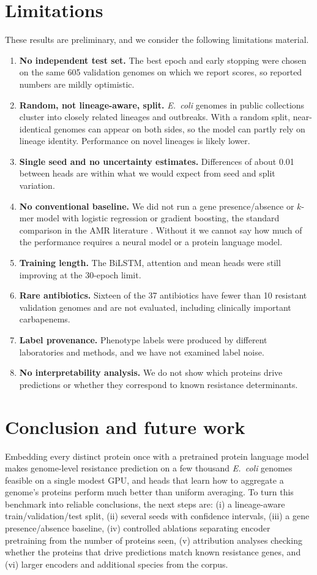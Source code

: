 \documentclass[11pt,a4paper]{article}
\begin{document}
\section{Limitations}\label{sec:limits}
These results are preliminary, and we consider the following limitations material.
\begin{enumerate}
  \item \textbf{No independent test set.} The best epoch and early stopping were chosen on the same 605 validation genomes on which we report scores, so reported numbers are mildly optimistic.
  \item \textbf{Random, not lineage-aware, split.} \textit{E.~coli} genomes in public collections cluster into closely related lineages and outbreaks. With a random split, near-identical genomes can appear on both sides, so the model can partly rely on lineage identity. Performance on novel lineages is likely lower.
  \item \textbf{Single seed and no uncertainty estimates.} Differences of about 0.01 between heads are within what we would expect from seed and split variation.
  \item \textbf{No conventional baseline.} We did not run a gene presence/absence or $k$-mer model with logistic regression or gradient boosting, the standard comparison in the AMR literature \citep{moradigaravand2018}. Without it we cannot say how much of the performance requires a neural model or a protein language model.
  \item \textbf{Training length.} The BiLSTM, attention and mean heads were still improving at the 30-epoch limit.
  \item \textbf{Rare antibiotics.} Sixteen of the 37 antibiotics have fewer than 10 resistant validation genomes and are not evaluated, including clinically important carbapenems.
  \item \textbf{Label provenance.} Phenotype labels were produced by different laboratories and methods, and we have not examined label noise.
  \item \textbf{No interpretability analysis.} We do not show which proteins drive predictions or whether they correspond to known resistance determinants.
\end{enumerate}

\section{Conclusion and future work}
Embedding every distinct protein once with a pretrained protein language model makes genome-level resistance prediction on a few thousand \textit{E.~coli} genomes feasible on a single modest GPU,
and heads that learn how to aggregate a genome's proteins perform much better than uniform averaging.
To turn this benchmark into reliable conclusions, the next steps are: (i) a lineage-aware train/validation/test split, (ii) several seeds with confidence intervals, (iii) a gene presence/absence baseline,
(iv) controlled ablations separating encoder pretraining from the number of proteins seen,
(v) attribution analyses checking whether the proteins that drive predictions match known resistance genes, and (vi) larger encoders and additional species from the corpus.
\end{document}
